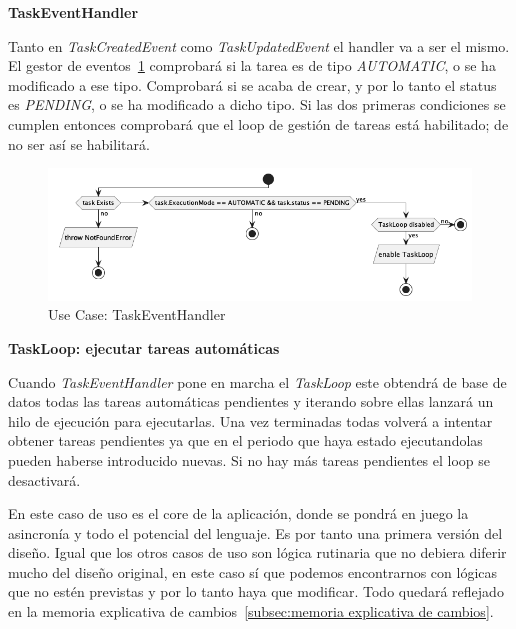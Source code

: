 \textbf{TaskEventHandler}

Tanto en \textit{TaskCreatedEvent} como \textit{TaskUpdatedEvent} el handler va a ser el mismo. El gestor de eventos~\cref{fig:Use Case-TaskEventHandler} comprobará si la tarea es de tipo \textit{AUTOMATIC}, o se ha modificado a ese tipo. Comprobará si se acaba de crear, y por lo tanto el status es \textit{PENDING}, o se ha modificado a dicho tipo. Si las dos primeras condiciones se cumplen entonces comprobará que el loop de gestión de tareas está habilitado; de no ser así se habilitará.

\begin{figure}[H]
    \centering
    \includegraphics[height=0.2\textheight]{./part/Proyecto_ejecutivo/memoria_descriptiva/descripcionDelProyecto/manager/uml/taskEventHandlerUseCase}
    \caption{Use Case: TaskEventHandler}\label{fig:Use Case-TaskEventHandler}
\end{figure}

\textbf{TaskLoop: ejecutar tareas automáticas}\label{ref:X}

Cuando \textit{TaskEventHandler} pone en marcha el \textit{TaskLoop} este obtendrá de base de datos todas las tareas automáticas pendientes y iterando sobre ellas lanzará un hilo de ejecución para ejecutarlas. Una vez terminadas todas volverá a intentar obtener tareas pendientes ya que en el periodo que haya estado ejecutandolas pueden haberse introducido nuevas. Si no hay más tareas pendientes el loop se desactivará.

En este caso de uso es el core de la aplicación, donde se pondrá en juego la asincronía y todo el potencial del lenguaje. Es por tanto una primera versión del diseño. Igual que los otros casos de uso son lógica rutinaria que no debiera diferir mucho del diseño original, en este caso sí que podemos encontrarnos con lógicas que no estén previstas y por lo tanto haya que modificar. Todo quedará reflejado en la memoria explicativa de cambios~\cref{subsec:memoria explicativa de cambios}.

